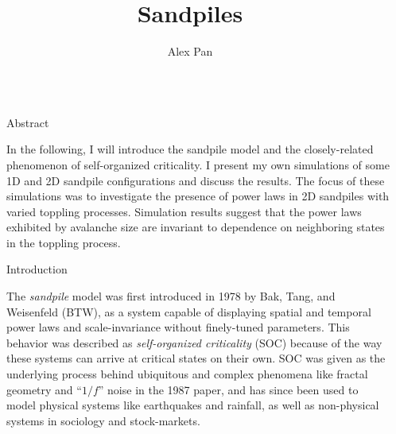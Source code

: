 \documentclass[final]{beamer}
\title{Sandpiles} %
\author{Alex Pan} %
\institute{Reed College} %
\newlength{\sepwid}
\newlength{\onecolwid}
\begin{document}

\setlength{\belowcaptionskip}{2ex} %
\setlength\belowdisplayshortskip{2ex} %

\begin{frame}[t] %

\begin{columns}[t] %

\begin{column}{\sepwid}\end{column} %

\begin{column}{\onecolwid} %


\begin{alertblock}{Abstract}

In the following, I will introduce the sandpile model and the closely-related phenomenon of self-organized criticality. I present my own simulations of some 1D and 2D sandpile configurations and discuss the results. The focus of these simulations was to investigate the presence of power laws in 2D sandpiles with varied toppling processes. Simulation results suggest that the power laws exhibited by avalanche size are invariant to dependence on neighboring states in the toppling process. 

\end{alertblock}


\begin{block}{Introduction}

The \textit{sandpile} model was first introduced in 1978 by Bak, Tang, and Weisenfeld (BTW),  as a system capable of displaying spatial and temporal power laws and scale-invariance without finely-tuned parameters. This behavior was described as \textit{self-organized criticality} (SOC) because of the way these systems can arrive at critical states on their own. SOC was given as the underlying process behind ubiquitous and complex phenomena like fractal geometry and ``$1/f$'' noise in the 1987 paper, and has since been used to model physical systems like earthquakes and rainfall, as well as non-physical systems in sociology and stock-markets.


\end{block}
\end{column}
\end{columns}
\end{frame}
\end{document}
